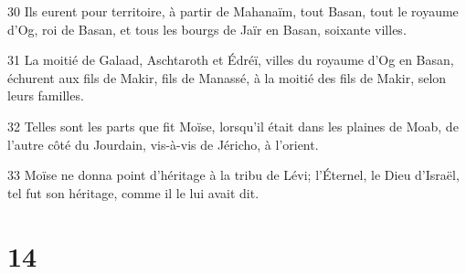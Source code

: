 \par 30 Ils eurent pour territoire, à partir de Mahanaïm, tout Basan, tout le royaume d'Og, roi de Basan, et tous les bourgs de Jaïr en Basan, soixante villes.
\par 31 La moitié de Galaad, Aschtaroth et Édréï, villes du royaume d'Og en Basan, échurent aux fils de Makir, fils de Manassé, à la moitié des fils de Makir, selon leurs familles.
\par 32 Telles sont les parts que fit Moïse, lorsqu'il était dans les plaines de Moab, de l'autre côté du Jourdain, vis-à-vis de Jéricho, à l'orient.
\par 33 Moïse ne donna point d'héritage à la tribu de Lévi; l'Éternel, le Dieu d'Israël, tel fut son héritage, comme il le lui avait dit.

\chapter{14}

